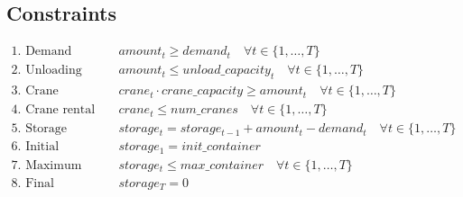 \documentclass{article}
\begin{document}
\subsection*{Constraints}
\begin{align}
    \text{1. Demand fulfillment:} & \quad amount_{t} \geq demand_{t} \quad \forall t \in \{1, \ldots, T\} \\
    \text{2. Unloading capacity:} & \quad amount_{t} \leq unload\_capacity_{t} \quad \forall t \in \{1, \ldots, T\} \\
    \text{3. Crane capacity:} & \quad crane_{t} \cdot crane\_capacity \geq amount_{t} \quad \forall t \in \{1, \ldots, T\} \\
    \text{4. Crane rental limit:} & \quad crane_{t} \leq num\_cranes \quad \forall t \in \{1, \ldots, T\} \\
    \text{5. Storage balance:} & \quad storage_{t} = storage_{t-1} + amount_{t} - demand_{t} \quad \forall t \in \{1, \ldots, T\} \\
    \text{6. Initial storage:} & \quad storage_{1} = init\_container \\
    \text{7. Maximum storage:} & \quad storage_{t} \leq max\_container \quad \forall t \in \{1, \ldots, T\} \\
    \text{8. Final storage:} & \quad storage_{T} = 0
\end{align}
\end{document}
